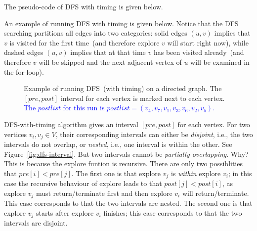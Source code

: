 The pseudo-code of DFS with timing is given below.

\begin{algorithmblock}[0.8\textwidth]
	\xxx
	\xxx
	\xxx
	\xxx
\end{algorithmblock}

\begin{algorithmblock}[0.8\textwidth]
	\xxx
	\xxx
	\xxx
	\xxx
	\xxx
	\xxx
	\xxx
	\xxx
	\xxx
\end{algorithmblock}

An example of running DFS with timing is given below.
Notice that the DFS searching partitions all edges into two categories:
solid edges $(u,v)$ implies that $v$ is visited for the first time~(and therefore explore $v$ will start right now),
while dashed edges $(u,v)$ implies that at that time $v$ has been visited already~(and therefore $v$ will be skipped and the next adjacent
vertex of $u$ will be examined in the for-loop). 

\begin{figure}[h!]
\centering{}
\caption{Example of running DFS~(with timing) on a directed graph. 
The $[pre,post]$ interval for each vertex
is marked next to each vertex. 
\textcolor{blue}{The $postlist$ for this run is $postlist = (v_4,v_7,v_1,v_3,v_6,v_2,v_5)$.}}
\end{figure}

DFS-with-timing algorithm gives an interval $[pre,post]$ for each vertex.
For two vertices $v_i,v_j\in V$, their corresponding intervals can either be
\emph{disjoint}, i.e., the two intervals do not overlap, or \emph{nested}, i.e.,
one interval is within the other. See Figure~\ref{fig:dfs-interval}.
But two intervals cannot be \emph{partially overlapping}. Why? This is because
the explore funtion is recursive. There are only two possiblities
that $pre[i] < pre[j]$. The first one is that explore $v_j$ is \emph{within} explore $v_i$;
in this case the recursive behaviour of explore leads to that $post[j] < post[i]$,
as explore $v_j$ must return/terminate first and then explore $v_i$ will return/terminate.
This case corresponds to that the two intervals are nested.
The second one is that explore $v_j$ starts after explore $v_i$ finishes;
this case corresponds to that the two intervals are disjoint.

